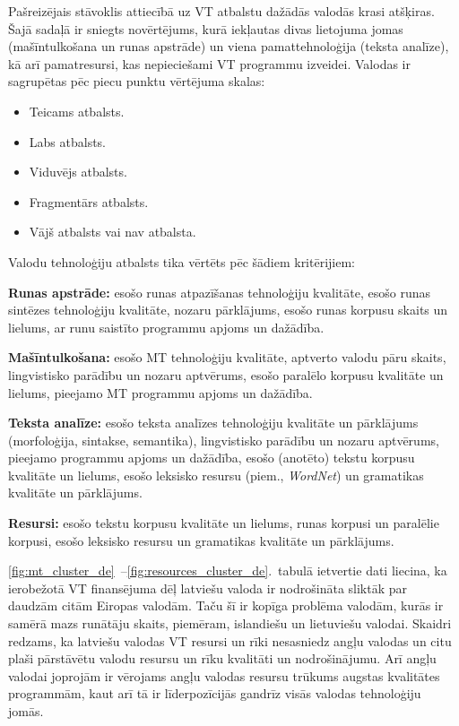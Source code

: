 \begin{multicols}{2}
Pašreizējais stāvoklis attiecībā uz VT atbalstu dažādās valodās krasi atšķiras.
Šajā sadaļā ir sniegts novērtējums, kurā iekļautas divas lietojuma jomas (mašīntulkošana un runas apstrāde) un viena pamattehnoloģija (teksta analīze), kā arī pamatresursi, kas nepieciešami VT programmu izveidei.
Valodas ir sagrupētas pēc piecu punktu vērtējuma skalas:

\begin{itemize}
\item Teicams atbalsts.
\item Labs atbalsts.
\item Viduvējs atbalsts.
\item Fragmentārs atbalsts.
\item Vājš atbalsts vai nav atbalsta.
\end{itemize}

Valodu tehnoloģiju atbalsts tika vērtēts pēc šādiem kritērijiem:

\textbf{Runas apstrāde:} esošo runas atpazīšanas tehnoloģiju kvalitāte, esošo runas sintēzes tehnoloģiju kvalitāte, nozaru pārklājums, esošo runas korpusu skaits un lielums, ar runu saistīto programmu apjoms un dažādība.

\textbf{Mašīntulkošana:} esošo MT tehnoloģiju kvalitāte, aptverto valodu pāru skaits, lingvistisko parādību un nozaru aptvērums, esošo paralēlo korpusu kvalitāte un lielums, pieejamo MT programmu apjoms un dažādība.

\textbf{Teksta analīze:} esošo teksta analīzes tehnoloģiju kvalitāte un pārklājums (morfoloģija, sintakse, semantika), lingvistisko parādību un nozaru aptvērums, pieejamo programmu apjoms un dažādība, esošo (anotēto) tekstu korpusu kvalitāte un lielums, esošo leksisko resursu (piem., \textit{WordNet}) un gramatikas kvalitāte un pārklājums.

\textbf{Resursi:} esošo tekstu korpusu kvalitāte un lielums, runas korpusi un paralēlie korpusi, esošo leksisko resursu un gramatikas kvalitāte un pārklājums.

\ref{fig:mt_cluster_de}~--\ref{fig:resources_cluster_de}.~tabulā ietvertie dati liecina, ka ierobežotā VT finansējuma dēļ latviešu valoda ir nodrošināta sliktāk par daudzām citām Eiropas valodām.
Taču šī ir kopīga problēma valodām, kurās ir samērā mazs runātāju skaits, piemēram, islandiešu un lietuviešu valodai.
Skaidri redzams, ka latviešu valodas VT resursi un rīki nesasniedz angļu valodas un citu plaši pārstāvētu valodu  resursu un rīku kvalitāti un nodrošinājumu.
Arī angļu valodai joprojām ir vērojams angļu valodas resursu trūkums augstas kvalitātes programmām, kaut arī tā ir līderpozīcijās gandrīz visās valodas tehnoloģiju jomās.


\end{multicols}
